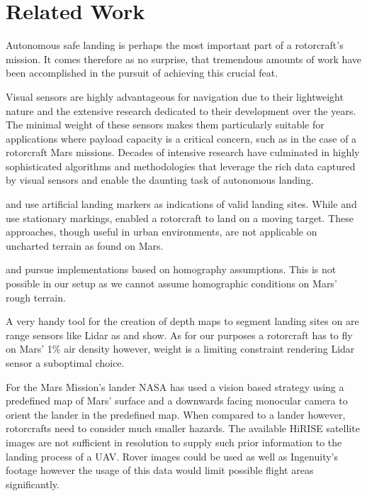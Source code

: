 \chapter{Related Work}
\label{sec:relwork}

Autonomous safe landing is perhaps the most important part of a rotorcraft's mission. It comes therefore as no surprise, that tremendous amounts of work have been accomplished in the pursuit of achieving this crucial feat. 

Visual sensors are highly advantageous for navigation due to their lightweight nature and the extensive research dedicated to their development over the years. The minimal weight of these sensors makes them particularly suitable for applications where payload capacity is a critical concern, such as in the case of a rotorcraft Mars missions. Decades of intensive research have culminated in highly sophisticated algorithms and methodologies that leverage the rich data captured by visual sensors and enable the daunting task of autonomous landing.

\citep{Saripalli2002VisionBasedLanding,Falanga2017QuadrotorLanding} and \citep{Mu2023VisionBasedLanding} use artificial landing markers as indications of valid landing sites. While \citep{Saripalli2002VisionBasedLanding} and \citep{Mu2023VisionBasedLanding} use stationary markings, \citep{Falanga2017QuadrotorLanding} enabled a rotorcraft to land on a moving target. These approaches,  though useful in urban environments,  are not applicable on uncharted terrain as found on Mars.

\citep{Bosch2006AutonomousDetection,Brockers2011AutonomousLanding,Desaraju2015VisionBased} and \citep{Brockers2014TowardsAutonomous} pursue implementations based on homography assumptions. This is not possible in our setup as we cannot assume homographic conditions on Mars' rough terrain. %

A very handy tool for the creation of depth maps to segment landing sites on are range sensors like Lidar as \citep{Trawny2015FlightTesting, Luna2017Evaluation, Johnson2002LidarBased} and \citep{Scherer2012AutonomousLanding} show. As for our purposes a rotorcraft has to fly on Mars' 1\% air density however, weight is a limiting constraint rendering Lidar sensor a suboptimal choice.

For the Mars Mission's lander NASA has used a vision based strategy using a predefined map of Mars' surface and a downwards facing monocular camera to orient the lander in the predefined map\citep{Johnson2020Mars2020}. When compared to a lander however, rotorcrafts need to consider much smaller hazards. The available HiRISE satellite images are not sufficient in resolution to supply such prior information to the landing process of a UAV. Rover images could be used as well as Ingenuity's footage however the usage of this data would limit possible flight areas significantly.


